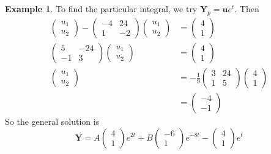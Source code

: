 \documentclass[a4paper]{article}
\theoremstyle{definition}
\newtheorem*{eg}{Example}
\newcommand{\mb}[1]{\mathbf{#1}}
\begin{document}
\begin{eg}
To find the particular integral, we try $\mb{Y}_p = \mb{u}e^t$. Then
\begin{align*}
  \begin{pmatrix}
    u_1\\u_2
  \end{pmatrix} - 
  \begin{pmatrix}
    -4 & 24\\
    1 & -2
  \end{pmatrix}
  \begin{pmatrix}
    u_1\\u_2
  \end{pmatrix}&=
  \begin{pmatrix}
    4\\1
  \end{pmatrix}\\
  \begin{pmatrix}
    5 & -24\\
    -1 & 3
  \end{pmatrix}
  \begin{pmatrix}
    u_1\\u_2
  \end{pmatrix}&= 
  \begin{pmatrix}
    4\\1
  \end{pmatrix}\\
  \begin{pmatrix}
    u_1\\u_2
  \end{pmatrix} &= -\frac{1}{9}
  \begin{pmatrix}
    3 & 24\\
    1 & 5
  \end{pmatrix}
  \begin{pmatrix}
    4 \\ 1
  \end{pmatrix}\\
  &= 
  \begin{pmatrix}
    -4\\-1
  \end{pmatrix}
\end{align*}
So the general solution is
\[
\mb{Y} = A
\begin{pmatrix}
  4\\1
\end{pmatrix}e^{2t} + B
\begin{pmatrix}
  -6\\1
\end{pmatrix}e^{-8t} - 
\begin{pmatrix}
  4\\1
\end{pmatrix}e^t
\]
\end{eg}
\end{document}
